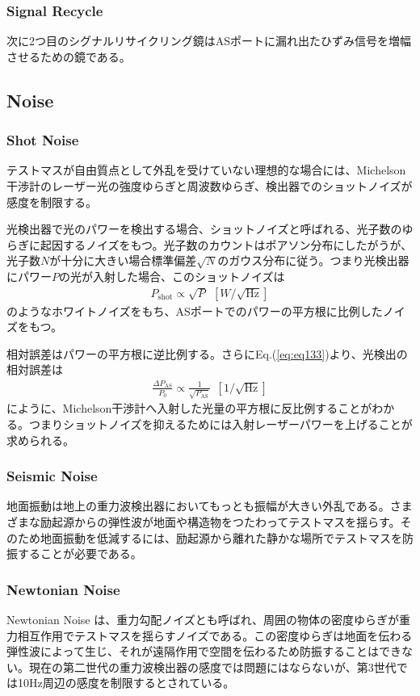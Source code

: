 \subsubsection{Signal Recycle}
次に2つ目のシグナルリサイクリング鏡はASポートに漏れ出たひずみ信号を増幅させるための鏡である。

\subsection{Noise}
\subsubsection{Shot Noise}
テストマスが自由質点として外乱を受けていない理想的な場合には、Michelson干渉計のレーザー光の強度ゆらぎと周波数ゆらぎ、検出器でのショットノイズが感度を制限する。

光検出器で光のパワーを検出する場合、ショットノイズと呼ばれる、光子数のゆらぎに起因するノイズをもつ。光子数のカウントはポアソン分布にしたがうが、光子数$N$が十分に大きい場合標準偏差$\sqrt{N}$のガウス分布に従う。つまり光検出器にパワー$P$の光が入射した場合、このショットノイズは
\begin{eqnarray}
  P_{\mathrm{shot}} \propto \sqrt{P}\ \ [W/\sqrt{\mathrm{Hz}}]  \label{eq:eq136}
\end{eqnarray}
のようなホワイトノイズをもち、ASポートでのパワーの平方根に比例したノイズをもつ。

相対誤差はパワーの平方根に逆比例する。さらにEq.(\ref{eq:eq133})より、光検出の相対誤差は
\begin{eqnarray}
  \frac{\Delta P_{\mathrm{AS}}}{P_{\mathrm{0}}}  \propto \frac{1}{\sqrt{P_{\mathrm{AS}}}}\ \ [1/\sqrt{\mathrm{Hz}}]  \label{eq:eq136}
\end{eqnarray}
にように、Michelson干渉計へ入射した光量の平方根に反比例することがわかる。つまりショットノイズを抑えるためには入射レーザーパワーを上げることが求められる。

\subsubsection{Seismic Noise}
地面振動は地上の重力波検出器においてもっとも振幅が大きい外乱である。さまざまな励起源からの弾性波が地面や構造物をつたわってテストマスを揺らす。そのため地面振動を低減するには、励起源から離れた静かな場所でテストマスを防振することが必要である。

\subsubsection{Newtonian Noise}
Newtonian Noise は、重力勾配ノイズとも呼ばれ、周囲の物体の密度ゆらぎが重力相互作用でテストマスを揺らすノイズである。この密度ゆらぎは地面を伝わる弾性波によって生じ、それが遠隔作用で空間を伝わるため防振することはできない。現在の第二世代の重力波検出器の感度では問題にはならないが、第3世代では10Hz周辺の感度を制限するとされている。

